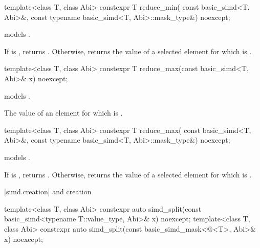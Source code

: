 \begin{itemdecl}
template<class T, class Abi>
  constexpr T reduce_min(
    const basic_simd<T, Abi>&, const typename basic_simd<T, Abi>::mask_type&) noexcept;
\end{itemdecl}

\begin{itemdescr}
  \pnum\constraints
   models .

  \pnum\returns
  If  is , returns .
  Otherwise, returns the value of a selected element  for which  is  \forallmaskedi.
\end{itemdescr}

\begin{itemdecl}
template<class T, class Abi> constexpr T reduce_max(const basic_simd<T, Abi>& x) noexcept;
\end{itemdecl}

\begin{itemdescr}
  \pnum\constraints
   models .

  \pnum\returns
  The value of an element  for which  is 
  \foralli.
\end{itemdescr}

\begin{itemdecl}
template<class T, class Abi>
  constexpr T reduce_max(
    const basic_simd<T, Abi>&, const typename basic_simd<T, Abi>::mask_type&) noexcept;
\end{itemdecl}

\begin{itemdescr}
  \pnum\constraints
   models .

  \pnum\returns
  If  is , returns .
  Otherwise, returns the value of a selected element  for which  is  \forallmaskedi.
\end{itemdescr}

[simd.creation]{ and  creation}

\begin{itemdecl}
template<class T, class Abi>
  constexpr auto simd_split(const basic_simd<typename T::value_type, Abi>& x) noexcept;
template<class T, class Abi>
  constexpr auto simd_split(const basic_simd_mask<@\maskelementsize@<T>, Abi>& x) noexcept;
\end{itemdecl}

